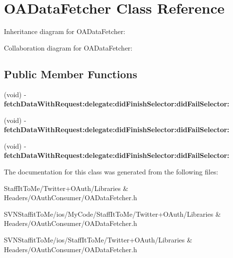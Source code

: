 \hypertarget{interface_o_a_data_fetcher}{
\section{\-O\-A\-Data\-Fetcher \-Class \-Reference}
\label{interface_o_a_data_fetcher}
}


\-Inheritance diagram for \-O\-A\-Data\-Fetcher\-:


\-Collaboration diagram for \-O\-A\-Data\-Fetcher\-:
\subsection*{\-Public \-Member \-Functions}
\begin{DoxyCompactItemize}
\item 
\hypertarget{interface_o_a_data_fetcher_a2d7d8d39f2cfd35f805e1c629406456a}{
(void) -\/ {\bfseries fetch\-Data\-With\-Request\-:delegate\-:did\-Finish\-Selector\-:did\-Fail\-Selector\-:}}
\label{interface_o_a_data_fetcher_a2d7d8d39f2cfd35f805e1c629406456a}

\item 
\hypertarget{interface_o_a_data_fetcher_a2d7d8d39f2cfd35f805e1c629406456a}{
(void) -\/ {\bfseries fetch\-Data\-With\-Request\-:delegate\-:did\-Finish\-Selector\-:did\-Fail\-Selector\-:}}
\label{interface_o_a_data_fetcher_a2d7d8d39f2cfd35f805e1c629406456a}

\item 
\hypertarget{interface_o_a_data_fetcher_a2d7d8d39f2cfd35f805e1c629406456a}{
(void) -\/ {\bfseries fetch\-Data\-With\-Request\-:delegate\-:did\-Finish\-Selector\-:did\-Fail\-Selector\-:}}
\label{interface_o_a_data_fetcher_a2d7d8d39f2cfd35f805e1c629406456a}

\end{DoxyCompactItemize}


\-The documentation for this class was generated from the following files\-:\begin{DoxyCompactItemize}
\item 
\-Staff\-It\-To\-Me/\-Twitter+\-O\-Auth/\-Libraries \& Headers/\-O\-Auth\-Consumer/\-O\-A\-Data\-Fetcher.\-h\item 
\-S\-V\-N\-Staffit\-To\-Me/ios/\-My\-Code/\-Staff\-It\-To\-Me/\-Twitter+\-O\-Auth/\-Libraries \& Headers/\-O\-Auth\-Consumer/\-O\-A\-Data\-Fetcher.\-h\item 
\-S\-V\-N\-Staffit\-To\-Me/ios/\-Staff\-It\-To\-Me/\-Twitter+\-O\-Auth/\-Libraries \& Headers/\-O\-Auth\-Consumer/\-O\-A\-Data\-Fetcher.\-h\end{DoxyCompactItemize}
